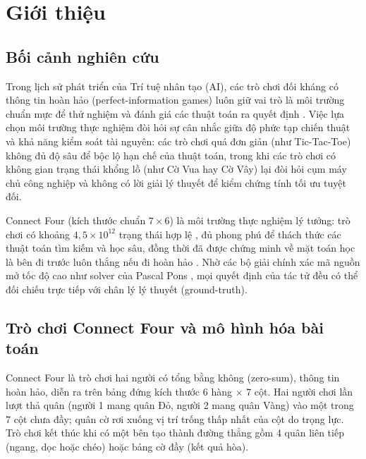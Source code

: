 \documentclass[11pt, a4paper]{article}
\begin{document}
\newpage
\tableofcontents
\newpage

\section{Giới thiệu}

\subsection{Bối cảnh nghiên cứu}
Trong lịch sử phát triển của Trí tuệ nhân tạo (AI), các trò chơi đối kháng có thông tin hoàn hảo (perfect-information games) luôn giữ vai trò là môi trường chuẩn mực để thử nghiệm và đánh giá các thuật toán ra quyết định \cite{russell2021artificial}. Việc lựa chọn môi trường thực nghiệm đòi hỏi sự cân nhắc giữa độ phức tạp chiến thuật và khả năng kiểm soát tài nguyên: các trò chơi quá đơn giản (như Tic-Tac-Toe) không đủ độ sâu để bộc lộ hạn chế của thuật toán, trong khi các trò chơi có không gian trạng thái khổng lồ (như Cờ Vua hay Cờ Vây) lại đòi hỏi cụm máy chủ công nghiệp và không có lời giải lý thuyết để kiểm chứng tính tối ưu tuyệt đối.

Connect Four (kích thước chuẩn $7 \times 6$) là môi trường thực nghiệm lý tưởng: trò chơi có khoảng $4{,}5 \times 10^{12}$ trạng thái hợp lệ \cite{tromp2008solving}, đủ phong phú để thách thức các thuật toán tìm kiếm và học sâu, đồng thời đã được chứng minh về mặt toán học là bên đi trước luôn thắng nếu đi hoàn hảo \cite{allis1988knowledge}. Nhờ các bộ giải chính xác mã nguồn mở tốc độ cao như solver của Pascal Pons \cite{pons2019connect4}, mọi quyết định của tác tử đều có thể đối chiếu trực tiếp với chân lý lý thuyết (ground-truth).

\subsection{Trò chơi Connect Four và mô hình hóa bài toán}
Connect Four là trò chơi hai người có tổng bằng không (zero-sum), thông tin hoàn hảo, diễn ra trên bảng đứng kích thước 6 hàng $\times$ 7 cột. Hai người chơi lần lượt thả quân (người 1 mang quân Đỏ, người 2 mang quân Vàng) vào một trong 7 cột chưa đầy; quân cờ rơi xuống vị trí trống thấp nhất của cột do trọng lực. Trò chơi kết thúc khi có một bên tạo thành đường thẳng gồm 4 quân liên tiếp (ngang, dọc hoặc chéo) hoặc bảng cờ đầy (kết quả hòa).
\end{document}
